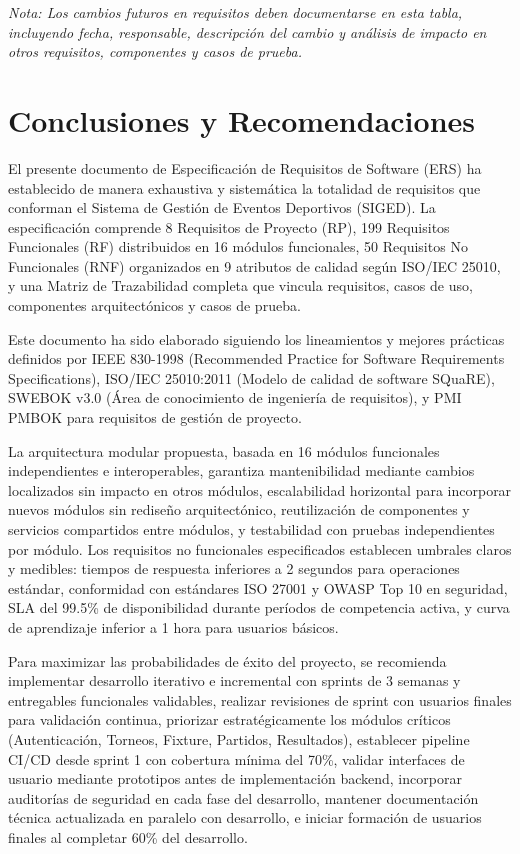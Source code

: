 \documentclass[12pt,a4paper]{article}
\begin{document}
\textit{Nota: Los cambios futuros en requisitos deben documentarse en esta tabla, incluyendo fecha, responsable, descripción del cambio y análisis de impacto en otros requisitos, componentes y casos de prueba.}

\newpage

\section{Conclusiones y Recomendaciones}

El presente documento de Especificación de Requisitos de Software (ERS) ha establecido de manera exhaustiva y sistemática la totalidad de requisitos que conforman el Sistema de Gestión de Eventos Deportivos (SIGED). La especificación comprende 8 Requisitos de Proyecto (RP), 199 Requisitos Funcionales (RF) distribuidos en 16 módulos funcionales, 50 Requisitos No Funcionales (RNF) organizados en 9 atributos de calidad según ISO/IEC 25010, y una Matriz de Trazabilidad completa que vincula requisitos, casos de uso, componentes arquitectónicos y casos de prueba.

Este documento ha sido elaborado siguiendo los lineamientos y mejores prácticas definidos por IEEE 830-1998 (Recommended Practice for Software Requirements Specifications), ISO/IEC 25010:2011 (Modelo de calidad de software SQuaRE), SWEBOK v3.0 (Área de conocimiento de ingeniería de requisitos), y PMI PMBOK para requisitos de gestión de proyecto.

La arquitectura modular propuesta, basada en 16 módulos funcionales independientes e interoperables, garantiza mantenibilidad mediante cambios localizados sin impacto en otros módulos, escalabilidad horizontal para incorporar nuevos módulos sin rediseño arquitectónico, reutilización de componentes y servicios compartidos entre módulos, y testabilidad con pruebas independientes por módulo. Los requisitos no funcionales especificados establecen umbrales claros y medibles: tiempos de respuesta inferiores a 2 segundos para operaciones estándar, conformidad con estándares ISO 27001 y OWASP Top 10 en seguridad, SLA del 99.5\% de disponibilidad durante períodos de competencia activa, y curva de aprendizaje inferior a 1 hora para usuarios básicos.

Para maximizar las probabilidades de éxito del proyecto, se recomienda implementar desarrollo iterativo e incremental con sprints de 3 semanas y entregables funcionales validables, realizar revisiones de sprint con usuarios finales para validación continua, priorizar estratégicamente los módulos críticos (Autenticación, Torneos, Fixture, Partidos, Resultados), establecer pipeline CI/CD desde sprint 1 con cobertura mínima del 70\%, validar interfaces de usuario mediante prototipos antes de implementación backend, incorporar auditorías de seguridad en cada fase del desarrollo, mantener documentación técnica actualizada en paralelo con desarrollo, e iniciar formación de usuarios finales al completar 60\% del desarrollo.
\end{document}
